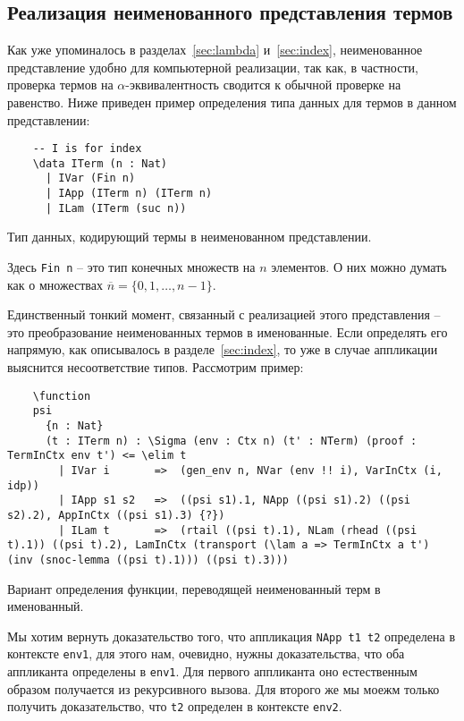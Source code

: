 \subsection{Реализация неименованного представления термов}

Как уже упоминалось в разделах~\ref{sec:lambda} и~\ref{sec:index}, неименованное представление удобно для компьютерной реализации, так как, в частности, проверка термов на $\alpha$-эквивалентность сводится к обычной проверке на равенство. Ниже приведен пример определения типа данных для термов в данном представлении:

\begin{listing}[H]
  \begin{verbatim}
    -- I is for index
    \data ITerm (n : Nat)
      | IVar (Fin n)
      | IApp (ITerm n) (ITerm n)
      | ILam (ITerm (suc n))
  \end{verbatim}
  \caption{Тип данных, кодирующий термы в неименованном представлении.}
\end{listing}

Здесь \texttt{Fin n} -- это тип конечных множеств на $n$ элементов. О них можно думать как о множествах $\overline{n} = \{0,1, \dots, n-1\}$.

Единственный тонкий момент, связанный с реализацией этого представления -- это преобразование неименованных термов в именованные. Если определять его напрямую, как описывалось в разделе~\ref{sec:index}, то уже в случае аппликации выяснится несоответствие типов. Рассмотрим пример:

\begin{listing}[H]
  \begin{verbatim}
    \function
    psi
      {n : Nat}
      (t : ITerm n) : \Sigma (env : Ctx n) (t' : NTerm) (proof : TermInCtx env t') <= \elim t
        | IVar i       =>  (gen_env n, NVar (env !! i), VarInCtx (i, idp))
        | IApp s1 s2   =>  ((psi s1).1, NApp ((psi s1).2) ((psi s2).2), AppInCtx ((psi s1).3) {?})
        | ILam t       =>  (rtail ((psi t).1), NLam (rhead ((psi t).1)) ((psi t).2), LamInCtx (transport (\lam a => TermInCtx a t') (inv (snoc-lemma ((psi t).1))) ((psi t).3)))
  \end{verbatim}
  \caption{Вариант определения функции, переводящей неименованный терм в именованный.}
\end{listing}

Мы хотим вернуть доказательство того, что аппликация \texttt{NApp t1 t2} определена в контексте \texttt{env1}, для этого нам, очевидно, нужны доказательства, что оба аппликанта определены в \texttt{env1}. Для первого аппликанта оно естественным образом получается из рекурсивного вызова. Для второго же мы моежм только получить доказательство,  что \texttt{t2}  определен в контексте \texttt{env2}.

